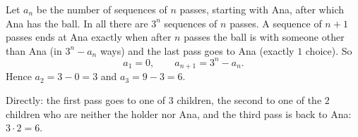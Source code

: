 Let $a_n$ be the number of sequences of $n$ passes, starting with Ana, after which Ana has the ball. In all there are $3^{n}$ sequences of $n$ passes. A sequence of $n+1$ passes ends at Ana exactly when after $n$ passes the ball is with someone other than Ana (in $3^n-a_n$ ways) and the last pass goes to Ana (exactly $1$ choice). So
\[
a_1=0,\qquad a_{n+1}=3^n-a_n .
\]
Hence $a_2=3-0=3$ and $a_3=9-3=\boxed{6}$.

Directly: the first pass goes to one of $3$ children, the second to one of the $2$ children who are neither the holder nor Ana, and the third pass is back to Ana: $3\cdot2=6$.
